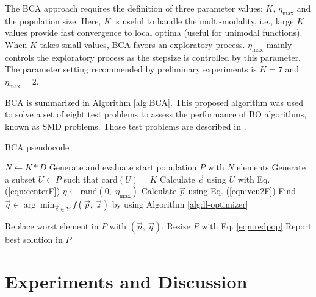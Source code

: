 \documentclass[conference]{IEEEtran}
\begin{document}
The BCA approach requires the definition of three parameter values: $K$, $\eta_{\max}$
and the population size. Here, $K$ is useful to handle the multi-modality, i.e.,
large $K$ values provide fast convergence to local optima (useful for unimodal functions).
When $K$ takes small values, BCA favors an exploratory process. $\eta_{\max}$ mainly
controls the exploratory process as the stepsize is controlled by this parameter.
The parameter setting recommended by preliminary experiments is $K = 7$ and $\eta_{\max} = 2$.

BCA is summarized in Algorithm \ref{alg:BCA}. This proposed algorithm was used to
solve a set of eight test problems to assess the performance of BO algorithms,
known as SMD problems. Those test problems  are described
in \cite{angelo2013differential,sinha2012unconstrained,sinha2014test}.
% 


\begin{algorithm}[!t]
    \caption{BCA pseudocode}
    \label{alg:BCA}
    \begin{algorithmic}[1]
        \STATE $N \gets K * D$
        \STATE Generate and evaluate start population $P$ with $N$ elements
                \STATE Generate a subset $U \subset P$ such that  card$(U) = K$
                \STATE Calculate $\vec{c}$ using $U$ with Eq. (\ref{eqn:centerF})
                \STATE $\eta \gets \text{rand}(0,\; \eta_{\max}) $ 
                \STATE Calculate $\vec{p}$ using Eq. (\ref{eqn:vcu2F})
                \STATE Find $\displaystyle \vec{q} \in \arg \min_{\vec{z}\in Y} f(\vec{p},\ \vec{z})$ by using Algorithm \ref{alg:ll-optimizer}
                
                    \STATE Replace worst element in $P$ with $(\vec{p},\ \vec{q})$.
                \ENDIF
            \ENDFOR
            \STATE Resize $P$ with Eq. \ref{eqn:redpop}
        \ENDWHILE
        \STATE Report best solution in $P$
    \end{algorithmic}
\end{algorithm}

\section{Experiments and Discussion}
\label{sec:experiments}
\end{document}
